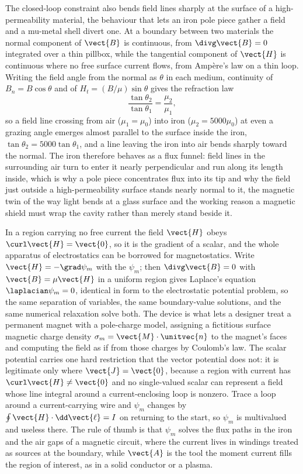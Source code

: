The closed-loop constraint also bends field lines sharply at the surface of
a high-permeability material, the behaviour that lets an iron pole piece
gather a field and a mu-metal shell divert one. At a boundary between two
materials the normal component of $\vect{B}$ is continuous, from
$\divg\vect{B} = 0$ integrated over a thin pillbox, while the tangential
component of $\vect{H}$ is continuous where no free surface current flows,
from Amp\`ere's law on a thin loop. Writing the field angle from the normal
as $\theta$ in each medium, continuity of $B_n = B\cos\theta$ and of $H_t =
(B/\mu)\sin\theta$ gives the refraction law
\[
\frac{\tan\theta_2}{\tan\theta_1} = \frac{\mu_2}{\mu_1},
\]
so a field line crossing from air ($\mu_1 = \mu_0$) into iron ($\mu_2 =
5000\mu_0$) at even a grazing angle emerges almost parallel to the surface
inside the iron, $\tan\theta_2 = 5000\tan\theta_1$, and a line leaving the
iron into air bends sharply toward the normal. The iron therefore behaves
as a flux funnel: field lines in the surrounding air turn to enter it nearly
perpendicular and run along its length inside, which is why a pole piece
concentrates flux into its tip and why the field just outside a
high-permeability surface stands nearly normal to it, the magnetic twin of
the way light bends at a glass surface and the working reason a magnetic
shield must wrap the cavity rather than merely stand beside it.



\begin{mastery}
In a region carrying no free current the field $\vect{H}$ obeys
$\curl\vect{H} = \vect{0}$, so it is the gradient of a scalar, and the
whole apparatus of electrostatics can be borrowed for magnetostatics. Write
$\vect{H} = -\grad\psi_m$ with the 
$\psi_m$; then $\divg\vect{B} = 0$ with $\vect{B} = \mu\vect{H}$ in a
uniform region gives Laplace's equation $\laplacian\psi_m = 0$, identical
in form to the electrostatic potential problem, so the same separation of
variables, the same boundary-value solutions, and the same numerical
relaxation solve both. The device is what lets a designer treat a permanent
magnet with a pole-charge model, assigning a fictitious surface magnetic
charge density $\sigma_m = \vect{M}\cdot\unitvec{n}$ to the magnet's faces
and computing the field as if from those charges by Coulomb's law. The
scalar potential carries one hard restriction that the vector potential
does not: it is legitimate only where $\vect{J} = \vect{0}$, because a
region with current has $\curl\vect{H}\neq\vect{0}$ and no single-valued
scalar can represent a field whose line integral around a current-enclosing
loop is nonzero. Trace a loop around a current-carrying wire and $\psi_m$
changes by $\oint\vect{H}\cdot\dd\vect{\ell} = I$ on returning to the start,
so $\psi_m$ is multivalued and useless there. The rule of thumb is that
$\psi_m$ solves the flux paths in the iron and the air gaps of a magnetic
circuit, where the current lives in windings treated as sources at the
boundary, while $\vect{A}$ is the tool the moment current fills the region
of interest, as in a solid conductor or a plasma.
\end{mastery}

